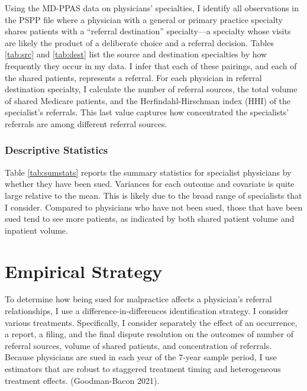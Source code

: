 \documentclass[
  12pt,
]{article}
\begin{document}
Using the MD-PPAS data on physicians' specialties, I identify all observations in the PSPP file where a physician with a general or primary practice specialty shares patients with a ``referral destination'' specialty---a specialty whose visits are likely the product of a deliberate choice and a referral decision. Tables \ref{tab:src} and \ref{tab:dest} list the source and destination specialties by how frequently they occur in my data. I infer that each of these pairings, and each of the shared patients, represents a referral. For each physician in referral destination specialty, I calculate the number of referral sources, the total volume of shared Medicare patients, and the Herfindahl-Hirschman index (HHI) of the specialist's referrals. This last value captures how concentrated the specialists' referrals are among different referral sources.\\

\hypertarget{descriptive-statistics}{%
\subsubsection{Descriptive Statistics}\label{descriptive-statistics}}

Table \ref{tab:sumstats} reports the summary statistics for specialist physicians by whether they have been sued. Variances for each outcome and covariate is quite large relative to the mean. This is likely due to the broad range of specialists that I consider. Compared to physicians who have not been sued, those that have been sued tend to see more patients, as indicated by both shared patient volume and inpatient volume.

\hypertarget{empirical-strategy}{%
\section{Empirical Strategy}\label{empirical-strategy}}

To determine how being sued for malpractice affects a physician's referral relationships, I use a difference-in-differences identification strategy. I consider various treatments. Specifically, I consider separately the effect of an occurrence, a report, a filing, and the final dispute resolution on the outcomes of number of referral sources, volume of shared patients, and concentration of referrals. Because physicians are sued in each year of the 7-year sample period, I use estimators that are robust to staggered treatment timing and heterogeneous treatment effects. (Goodman-Bacon 2021).
\end{document}
